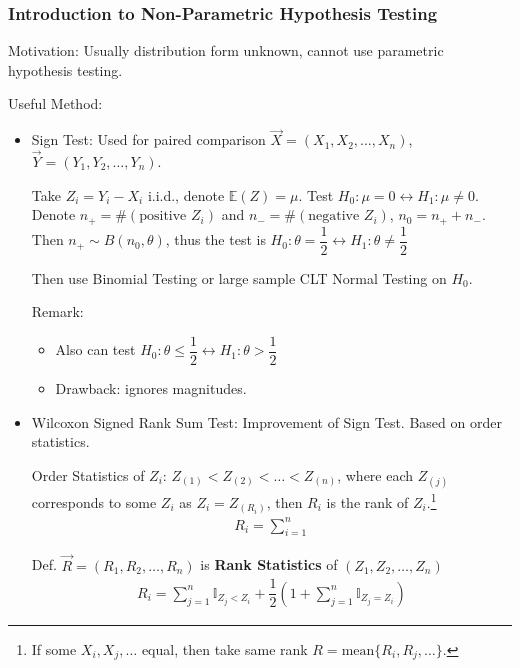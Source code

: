 \subsubsection{Introduction to Non-Parametric Hypothesis Testing}\label{SubSectionIntroToNonParametricHypothesisTesting}

    Motivation: Usually distribution form unknown, cannot use parametric hypothesis testing.

    Useful Method:
    \begin{itemize}
        \item Sign Test: Used for paired comparison $\vec{X}=(X_1,X_2,\ldots,X_n)$, $\vec{Y}=(Y_1,Y_2,\ldots,Y_n)$.
        
        Take $Z_i=Y_i-X_i$ i.i.d., denote $\mathbb{E}(Z)=\mu$. Test $H_0:\mu=0\longleftrightarrow H_1:\mu\neq 0$. Denote $n_+=\#(\text{positive } Z_i)$ and $n_-=\#(\text{negative }Z_i)$, $n_0=n_++n_-$. Then $n_+\sim B(n_0,\theta)$, thus the test is $H_0:\theta=\dfrac{1}{2}\longleftrightarrow H_1:\theta\neq\dfrac{1}{2}$
        
        Then use Binomial Testing or large sample CLT Normal Testing on $ H_0 $.

        Remark:
        \begin{itemize}
            \item Also can test $H_0:\theta\leq\dfrac{1}{2}\longleftrightarrow H_1:\theta>\dfrac{1}{2}$
            \item Drawback: ignores magnitudes.
        \end{itemize}
        
        \item {}Wilcoxon Signed Rank Sum Test: Improvement of Sign Test. Based on order statistics.
        
        Order Statistics of $Z_i$: $Z_{(1)}<Z_{(2)}<\ldots<Z_{(n)}$, where each $Z_{(j)}$ corresponds to some $Z_i$ as $Z_i=Z_{(R_i)}$, then $R_i$ is the rank of $Z_i$.\footnote{If some $X_i,X_j,\ldots$ equal, then take same rank $R=\mathrm{mean}\{R_i,R_j,\ldots\}$.}
        \begin{align*}
            R_i=\sum_{i=1}^n 
        \end{align*}
        
        
        
        Def. $\vec{R}=(R_1,R_2,\ldots,R_n)$ is \textbf{Rank Statistics} of $(Z_1,Z_2,\ldots,Z_n)$
        \begin{align*}
            R_i=\sum_{j=1}^n\mathbb{I}_{Z_j<Z_i}+\dfrac{1}{2}\left(1+\sum_{j=1}^n\mathbb{I}_{Z_j=Z_i} \right)
        \end{align*}
        

\end{itemize}
